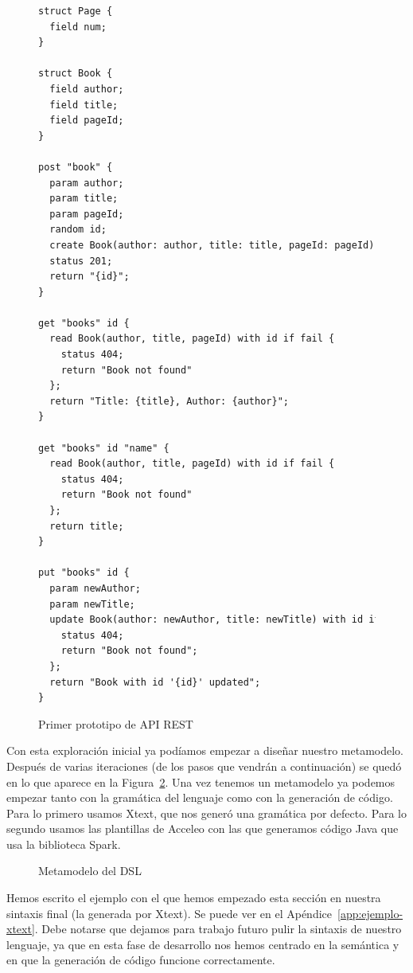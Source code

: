 \documentclass[runningheads]{llncs}
\begin{document}
\begin{figure}
    \begin{lstlisting}[language=rest, basicstyle=\scriptsize]
struct Page {
  field num;
}

struct Book {
  field author;
  field title;
  field pageId;
}

post "book" {
  param author;
  param title;
  param pageId;
  random id;
  create Book(author: author, title: title, pageId: pageId) with id;
  status 201;
  return "{id}";
}

get "books" id {
  read Book(author, title, pageId) with id if fail {
    status 404;
    return "Book not found"
  };
  return "Title: {title}, Author: {author}";
}

get "books" id "name" {
  read Book(author, title, pageId) with id if fail {
    status 404;
    return "Book not found"
  };
  return title;
}

put "books" id {
  param newAuthor;
  param newTitle;
  update Book(author: newAuthor, title: newTitle) with id if fail {
    status 404;
    return "Book not found";
  };
  return "Book with id '{id}' updated";
}
    \end{lstlisting}

\caption{Primer prototipo de API REST}
\label{fig:codigo-rest}
\end{figure}

Con esta exploración inicial ya podíamos empezar a diseñar
nuestro metamodelo.  Después de varias iteraciones (de los pasos
que vendrán a continuación) se quedó en lo que aparece en la
Figura~\ref{fig:metamodelo}. Una vez tenemos un metamodelo ya podemos
empezar tanto con la gramática del lenguaje como con la generación de
código. Para lo primero usamos Xtext, que nos generó una gramática
por defecto. Para lo segundo usamos las plantillas de Acceleo con las
que generamos código Java que usa la biblioteca Spark.

\begin{figure}
    \centering
    \caption{Metamodelo del DSL}
    \label{fig:metamodelo}
\end{figure}

Hemos escrito el ejemplo con el que hemos empezado esta sección en
nuestra sintaxis final (la generada por Xtext). Se puede ver en el
Apéndice~\ref{app:ejemplo-xtext}. Debe notarse que dejamos para trabajo
futuro pulir la sintaxis de nuestro lenguaje, ya que en esta fase de
desarrollo nos hemos centrado en la semántica y en que la generación
de código funcione correctamente.
\end{document}
